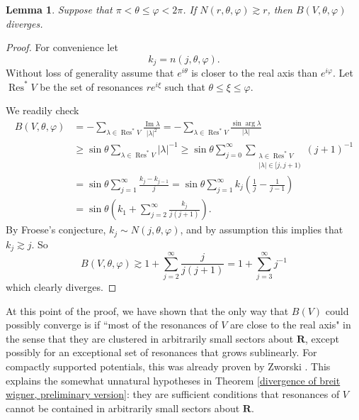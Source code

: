 \documentclass[12pt]{report}
\newcommand{\RR}{\mathbf{R}}
\DeclareMathOperator{\Res}{Res}
\renewcommand{\Im}{\operatorname{Im}}
\newtheorem{lemma}[theorem]{Lemma}
\theoremstyle{definition}
\begin{document}
\begin{lemma}
\label{divergence of angular series}
Suppose that $\pi < \theta \leq \varphi < 2\pi$. If $N(r, \theta, \varphi) \gtrsim r$, then $B(V, \theta, \varphi)$ diverges.
\end{lemma}
\begin{proof}
For convenience let
$$k_j = n(j, \theta, \varphi).$$
Without loss of generality assume that $e^{i\theta}$ is closer to the real axis than $e^{i\varphi}$.
Let $\Res^* V$ be the set of resonances $re^{i\xi}$ such that $\theta \leq \xi \leq \varphi$.

We readily check
\begin{align*}
B(V, \theta, \varphi) &= -\sum_{\lambda \in \Res^* V} \frac{\Im \lambda}{|\lambda|^2} = -\sum_{\lambda \in \Res^* V} \frac{\sin \arg \lambda}{|\lambda|}\\
  &\geq \sin \theta \sum_{\lambda \in \Res^* V} |\lambda|^{-1} \geq \sin \theta \sum_{j=0}^\infty \sum_{\substack{\lambda \in \Res^* V\\|\lambda| \in [j, j+1)}} (j+1)^{-1}\\
  &= \sin \theta \sum_{j=1}^\infty \frac{k_j - k_{j-1}}{j} = \sin \theta \sum_{j=1}^\infty k_j\left(\frac{1}{j} - \frac{1}{j-1}\right) \\
  &= \sin \theta\left(k_1 + \sum_{j=2}^\infty \frac{k_j}{j(j+1)}\right).
\end{align*}
By Froese's conjecture, $k_j \sim N(j, \theta, \varphi)$, and by assumption this implies that $k_j \gtrsim j$. So
$$B(V, \theta, \varphi) \gtrsim 1 + \sum_{j=2}^\infty \frac{j}{j(j+1)} = 1 + \sum_{j=3}^\infty j^{-1}$$
which clearly diverges.
\end{proof}
At this point of the proof, we have shown that the only way that $B(V)$ could possibly converge is if ``most of the resonances of $V$ are close to the real axis" in the sense that they are clustered in arbitrarily small sectors about $\RR$, except possibly for an exceptional set of resonances that grows sublinearly.
For compactly supported potentials, this was already proven by Zworski \cite{zworski1987distribution}.
This explains the somewhat unnatural hypotheses in Theorem \ref{divergence of breit wigner, preliminary version}: they are sufficient conditions that resonances of $V$ cannot be contained in arbitrarily small sectors about $\RR$.
\end{document}
